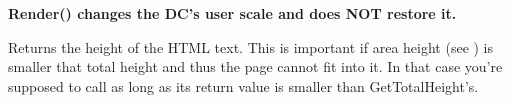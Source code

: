 {\bf Render() changes the DC's user scale and does NOT restore it.}

\label{wxhtmldcrenderergettotalheight}


Returns the height of the HTML text. This is important if area height (see )
is smaller that total height and thus the page cannot fit into it. In that case you're supposed to
call  as long as its return value is smaller than GetTotalHeight's.

